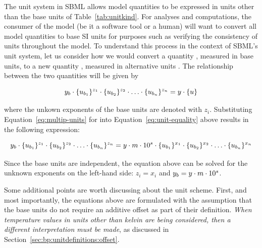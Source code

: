 The unit system in SBML allows model quantities to be expressed in
units other than the base units of Table~\ref{tab:unitkind}.  For
analyses and computations, the consumer of the model (be it a
software tool or a human) will want to convert all model
quantities to base SI units for purposes such as verifying the
consistency of units throughout the model.  To understand this
process in the context of SBML's unit system, let us consider how
we would convert a quantity \ybase, measured in base units, to a
new quantity \ynew, measured in alternative units \udef.  The
relationship between the two quantities will be given by
\begin{linenomath}
\begin{equation}
  y_b \cdot \{u_{b_1}\}^{z_1} \cdot \{u_{b_2}\}^{z_2} \cdot \ldots \cdot \{u_{b_n}\}^{z_n} = y  \cdot \{u\} 
\label{eq:unit-equality}
\end{equation}
\end{linenomath}
where the unkown exponents of the base units are denoted with
$z_i$.  Substituting Equation~\ref{eq:multip-units} for \udef into
Equation~\ref{eq:unit-equality} above results in the following
expression:
\begin{linenomath}
\begin{equation}
  y_b \cdot \{u_{b_1}\}^{z_1} \cdot \{u_{b_2}\}^{z_2} \cdot \ldots \cdot \{u_{b_n}\}^{z_n}
    = y \cdot m \cdot 10^s \cdot \{u_{b_1}\}^{x_1} \cdot \{u_{b_2}\}^{x_2} \cdot \ldots \cdot \{u_{b_n}\}^{x_n}
\label{eq:unit-conversion}
\end{equation}
\end{linenomath}
Since the base units are independent, the equation above can be
solved for the unknown exponents on the left-hand side:
$z_i = x_i$ and $y_b = y \cdot m \cdot 10^s$.

\label{sec:unit-simple-approach}
Some additional points are worth discussing about the unit scheme.
First, and most importantly, the equations
above are formulated with the assumption that the base units do
not require an additive offset as part of their definition.
\emph{When temperature values in units other than kelvin are being
  considered, then a different interpretation must be made}, as
discussed in Section~\ref{sec:bp:unitdefinitions:offset}.

